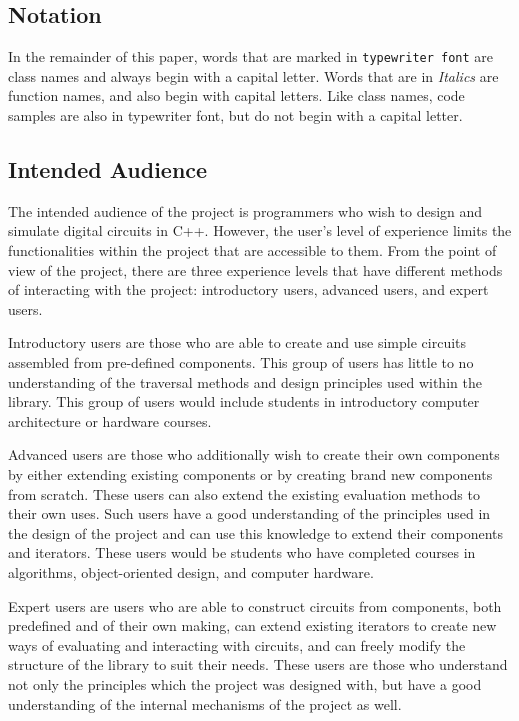 \documentclass{article}
\newcommand{\ClassName}[1]{\texttt{#1}}
\newcommand{\FunctionName}[1]{\textit{#1}}
\begin{document}
\subsection{Notation}

In the remainder of this paper, words that are marked in \ClassName{typewriter font} are class names and always begin with a capital letter. Words that are in \FunctionName{Italics} are function names, and also begin with capital letters. Like class names, code samples are also in typewriter font, but do not begin with a capital letter.

\subsection{Intended Audience}

The intended audience of the project is programmers who wish to design and simulate digital circuits in C++. However, the user's level of experience limits the functionalities within the project that are accessible to them. From the point of view of the project, there are three experience levels that have different methods of interacting with the project: introductory users, advanced users, and expert users.

Introductory users are those who are able to create and use simple circuits assembled from pre-defined components. This group of users has little to no understanding of the traversal methods and design principles used within the library. This group of users would include students in introductory computer architecture or hardware courses.

Advanced users are those who additionally wish to create their own components by either extending existing components or by creating brand new components from scratch. These users can also extend the existing evaluation methods to their own uses. Such users have a good understanding of the principles used in the design of the project and can use this knowledge to extend their components and iterators. These users would be students who have completed courses in algorithms, object-oriented design, and computer hardware.

Expert users are users who are able to construct circuits from components, both predefined and of their own making, can extend existing iterators to create new ways of evaluating and interacting with circuits, and can freely modify the structure of the library to suit their needs. These users are those who understand not only the principles which the project was designed with, but have a good understanding of the internal mechanisms of the project as well.
\end{document}
